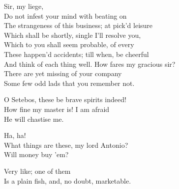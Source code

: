 \begin{verse_speech}[Prospero] 
Sir, my liege,\\
Do not infest your mind with beating on\\
The strangeness of this business; at pick'd leisure\\
Which shall be shortly, single I'll resolve you,\\
Which to you shall seem probable, of every\\
These happen'd accidents; till when, be cheerful\\
And think of each thing well.
How fares my gracious sir?\\
There are yet missing of your company\\
Some few odd lads that you remember not.
\end{verse_speech}




\begin{verse_speech}[Caliban] 
O Setebos, these be brave spirits indeed!\\
How fine my master is! I am afraid\\
He will chastise me.
\end{verse_speech}

\begin{verse_speech}[Sebastian] 
Ha, ha!\\
What things are these, my lord Antonio?\\
Will money buy 'em?
\end{verse_speech}

\begin{verse_speech}[Antonio] 
Very like; one of them\\
Is a plain fish, and, no doubt, marketable.
\end{verse_speech}

